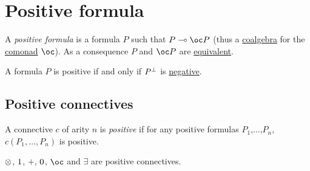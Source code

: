 \section{Positive formula}\label{positive-formula}

A \emph{positive formula} is a formula \(P\) such that \(P\limp\oc P\)
(thus a \href{https://en.wikipedia.org/wiki/F-coalgebra}{coalgebra} for the
\href{https://en.wikipedia.org/wiki/Comonad}{comonad} \(\oc\)). As a consequence \(P\) and
\(\oc P\) are \hyperref[equivalences]{equivalent}.

A formula \(P\) is positive if and only if \(P^\bot\) is
\hyperref[negative-formula]{negative}.

\subsection{Positive connectives}\label{positive-connectives}

A connective \(c\) of arity \(n\) is \emph{positive} if for any positive
formulas \(P_1\),...,\(P_n\), \(c(P_1,\dots,P_n)\) is positive.

\begin{proposition}
$\otimes$, $1$, $\plus$, $0$, $\oc$ and $\exists$ are positive connectives.
\end{proposition}

